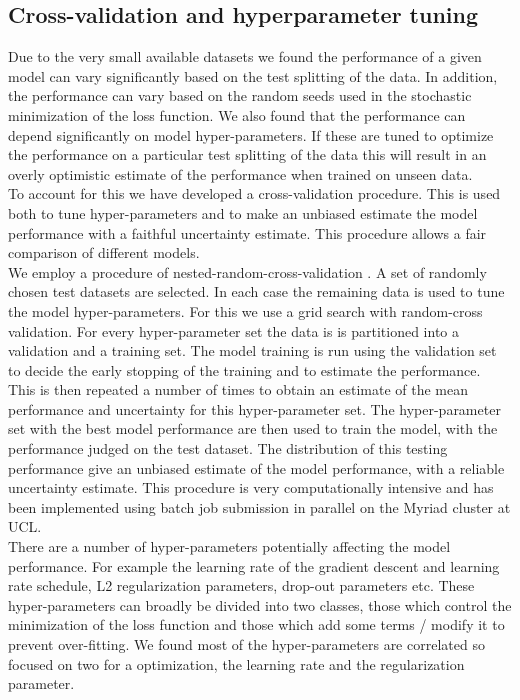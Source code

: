 \documentclass[NOTE, disdraft=true, UKenglish]{\DISCDTLATEXPATH UCLCDTDISdoc}
\begin{document}
\subsection{Cross-validation and hyperparameter tuning}
Due to the very small available datasets we found the performance of a given model can vary significantly based on the test splitting of the data. In addition, the performance can vary based on the random seeds used in the stochastic minimization of the loss function. We also found that the performance can depend significantly on model hyper-parameters. If these are tuned to optimize the performance on a particular test splitting of the data this will result in an overly optimistic estimate of the performance when trained on unseen data.
\\ \indent To account for this we have developed a cross-validation procedure. This is used both to tune hyper-parameters and to make an unbiased estimate the model performance with a faithful uncertainty estimate. This procedure allows a fair comparison of different models.
\\ \indent We employ a procedure of nested-random-cross-validation \cite{}. A set of randomly chosen test datasets  are selected. In each case the remaining data is used to tune the model hyper-parameters. For this we use a grid search with random-cross validation. For every hyper-parameter set the data is is partitioned into a validation and a training set. The model training is run using the validation set to decide the early stopping of the training and to estimate the performance. This is then repeated a number of times to obtain an estimate of the mean performance and uncertainty for this hyper-parameter set. The hyper-parameter set with the best model performance are then used to train the model, with the performance judged on the test dataset. The distribution of this testing performance give an unbiased estimate of the model performance, with a reliable uncertainty estimate. This procedure is very computationally intensive and has been implemented using batch job submission in parallel on the Myriad cluster at UCL.
\\ \indent There are a number of hyper-parameters potentially affecting the model performance. For example the learning rate of the gradient descent and learning rate schedule, L2 regularization parameters, drop-out parameters etc. These hyper-parameters can broadly be divided into two classes, those which control the minimization of the loss function and those which add some terms / modify it to prevent over-fitting. We found most of the hyper-parameters are correlated so focused on two for a optimization, the learning rate and the regularization parameter.
%
\end{document}
